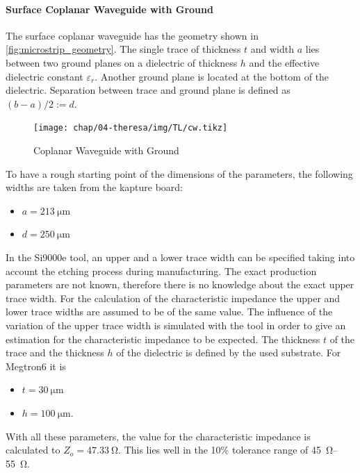 \paragraph{Surface Coplanar Waveguide with Ground}
The surface coplanar waveguide has the geometry shown in \autoref{fig:microstrip_geometry}.
The single trace of thickness $t$ and width $a$ lies between two ground planes on a dielectric of thickness $h$ and the effective dielectric constant $\varepsilon_r$.
Another ground plane is located at the bottom of the dielectric.
Separation between trace and ground plane is defined as $(b-a)/2 := d$. 

\begin{figure}[!htbp]
	\centering
	\texttt{[image: chap/04-theresa/img/TL/cw.tikz]}
	\caption{Coplanar Waveguide with Ground}
	\label{fig:microstrip_geometry}
\end{figure}

To have a rough starting point of the dimensions of the parameters, the following widths are taken from the \gls{kapture} board:
\begin{itemize}
	\item $a = \SI{213}{\micro \meter}$
	\item $d = \SI{250}{\micro \meter}$
\end{itemize}
In the Si9000e tool, an upper and a lower trace width can be specified taking into account the etching process during manufacturing.
The exact production parameters are not known, therefore there is no knowledge about the exact upper trace width.
For the calculation of the characteristic impedance the upper and lower trace widths are assumed to be of the same value.
The influence of the variation of the upper trace width is simulated with the tool in order to give an estimation for the characteristic impedance to be expected.
The thickness $t$ of the trace and the thickness $h$ of the dielectric is defined by the used substrate.
For Megtron6 it is 
\begin{itemize}
	\item $t = \SI{30}{\micro \meter}$
	\item $h = \SI{100}{\micro \meter}$.
\end{itemize}
With all these parameters, the value for the characteristic impedance is calculated to $Z_o = \SI{47.33}{\ohm}$.
This lies well in the 10\% tolerance range of \SIrange{45}{55}{\ohm}. 

